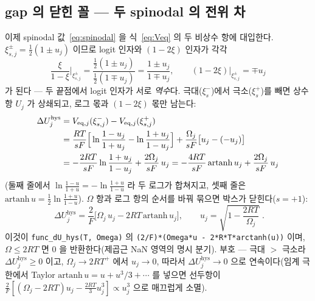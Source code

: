 \documentclass[11pt,a4paper]{article}
\newcommand{\eq}{\mathrm{eq}}
\newcommand{\hys}{\mathrm{hys}}
\newcommand{\code}[1]{\texttt{#1}}
\begin{document}
\subsection{gap 의 닫힌 꼴 — 두 spinodal 의 전위 차}
이제 spinodal 값~\eqref{eq:spinodal} 을 식~\eqref{eq:Veq} 의 두 비상수 항에 대입한다. $\xi_{s,j}^\pm=\tfrac12(1\pm u_j)$
이므로 logit 인자와 $(1-2\xi)$ 인자가 각각
\begin{equation}
\frac{\xi}{1-\xi}\bigg|_{\xi_{s,j}^\pm}=\frac{\tfrac12(1\pm u_j)}{\tfrac12(1\mp u_j)}=\frac{1\pm u_j}{1\mp u_j},
\qquad (1-2\xi)\big|_{\xi_{s,j}^\pm}=\mp u_j
\label{eq:hyssub}
\end{equation}
가 된다 — 두 끝점에서 logit 인자가 서로 \emph{역수}다. 극대($\xi_s^-$)에서 극소($\xi_s^+$)를 빼면 상수항 $U_j$ 가
상쇄되고, 로그 몫과 $(1-2\xi)$ 몫만 남는다:
\begin{align}
\Delta U_j^\hys
&=V_{\eq,j}(\xi_{s,j}^-)-V_{\eq,j}(\xi_{s,j}^+)\notag\\
&=\frac{RT}{sF}\Big[\ln\frac{1-u_j}{1+u_j}-\ln\frac{1+u_j}{1-u_j}\Big]
+\frac{\Omega_j}{sF}\big[u_j-(-u_j)\big]
\label{eq:hysdiff}\\
&=-\frac{2RT}{sF}\ln\frac{1+u_j}{1-u_j}+\frac{2\Omega_j}{sF}\,u_j
=-\frac{4RT}{sF}\,\mathrm{artanh}\,u_j+\frac{2\Omega_j}{sF}\,u_j\notag
\end{align}
(둘째 줄에서 $\ln\frac{1-u}{1+u}=-\ln\frac{1+u}{1-u}$ 라 두 로그가 합쳐지고, 셋째 줄은 $\mathrm{artanh}\,u=
\tfrac12\ln\tfrac{1+u}{1-u}$). $\Omega$ 항과 로그 항의 순서를 바꿔 묶으면 박스가 닫힌다($s=+1$):
\begin{equation}
\boxed{\;\Delta U_j^\hys
=\frac{2}{F}\Big[\Omega_j\,u_j-2RT\,\mathrm{artanh}\,u_j\Big],
\qquad u_j=\sqrt{1-\frac{2RT}{\Omega_j}}\;.}
\label{eq:dUhys}
\end{equation}
이것이 \code{func\_dU\_hys(T, Omega)} 의 \code{(2/F)*(Omega*u - 2*R*T*arctanh(u))} 이며, $\Omega\le2RT$ 면 $0$ 을
반환한다(제곱근 NaN 영역의 명시 분기). 부호 — 극대 $>$ 극소라 $\Delta U_j^\hys\ge0$ 이고, $\Omega_j\to2RT^+$ 에서
$u_j\to0$, 따라서 $\Delta U_j^\hys\to0$ 으로 연속이다(임계 극한에서 Taylor $\mathrm{artanh}\,u=u+u^3/3+\cdots$ 를
넣으면 선두항이 $\frac{2}{F}[(\Omega_j-2RT)u_j-\frac{2RT}{3}u_j^3]\propto u_j^3$ 으로 매끄럽게 소멸).
\end{document}
